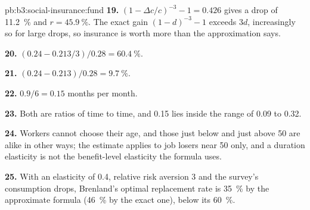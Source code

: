 \begin{solution}{pb:b3:social-insurance:fund}
\textbf{19.} $(1 - \Delta c/c)^{-3} - 1 = 0.426$ gives a drop of 11.2~\% and $r = 45.9~\%$. The exact gain $(1 - d)^{-3} - 1$ exceeds $3d$,
increasingly so for large drops, so insurance is worth more than the approximation
says.

\textbf{20.} $(0.24 - 0.213/3)/0.28 = 60.4~\%$.

\textbf{21.} $(0.24 - 0.213)/0.28 = 9.7~\%$.

\textbf{22.} $0.9/6 = 0.15$ months per month.

\textbf{23.} Both are ratios of time to time, and 0.15 lies inside the range of 0.09 to 0.32.

\textbf{24.} Workers cannot choose their age, and those just below and just above 50
are alike in other ways; the estimate applies to job losers near 50 only, and a
duration elasticity is not the benefit-level elasticity the formula uses.

\textbf{25.} With an elasticity of 0.4, relative risk aversion 3 and the survey's
consumption drops, Brenland's optimal replacement rate is 35~\% by the approximate
formula (46~\% by the exact one), below its 60~\%.
\end{solution}
